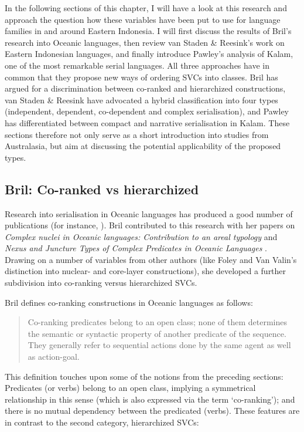 In the following sections of this chapter, I will have a look at this research and approach the question how these variables have been put to use for language families in and around Eastern Indonesia. I will first discuss the results of Bril's research into Oceanic languages, then review van Staden \& Reesink's work on Eastern Indonesian languages, and finally introduce Pawley's analysis of Kalam, one of the most remarkable serial languages. All three approaches have in common that they propose new ways of ordering SVCs into classes. Bril has argued for a discrimination between co-ranked and hierarchized constructions, van Staden \& Reesink have advocated a hybrid classification into four types (independent, dependent, co-dependent and complex serialisation), and Pawley has differentiated between compact and narrative serialisation in Kalam. These sections therefore not only serve as a short introduction into studies from Australasia, but aim at discussing the potential applicability of the proposed types.

\subsection{Bril: Co-ranked vs hierarchized}

Research into serialisation in Oceanic languages has produced a good number of publications (for instance, \citealt{durie1988verb, bradshaw1993subject, crowley1987serial, crowley2002serial}). Bril contributed to this research with her papers on \textit{Complex nuclei in Oceanic languages: Contribution to an areal typology}  \citep{bril2004complex} and \textit{Nexus and Juncture Types of Complex Predicates in Oceanic Languages} \citep{bril2007nexus}. Drawing on a number of variables from other authors (like Foley and Van Valin's distinction into nuclear- and core-layer constructions), she developed a further subdivision into co-ranking versus hierarchized SVCs. 

Bril defines co-ranking constructions in Oceanic languages as follows:

\begin{quote}Co-ranking predicates belong to an open class; none of them determines the semantic or syntactic property of another predicate of the sequence. They generally refer to sequential actions done by the same agent as well as action-goal. \citep[269]{bril2007nexus} \end{quote}

This definition touches upon some of the notions from the preceding sections: Predicates (or verbs) belong to an open class, implying a symmetrical relationship in this sense (which is also expressed via the term `co-ranking'); and there is no mutual dependency between the predicated (verbs). These features are in contrast to the second category, hierarchized SVCs:

